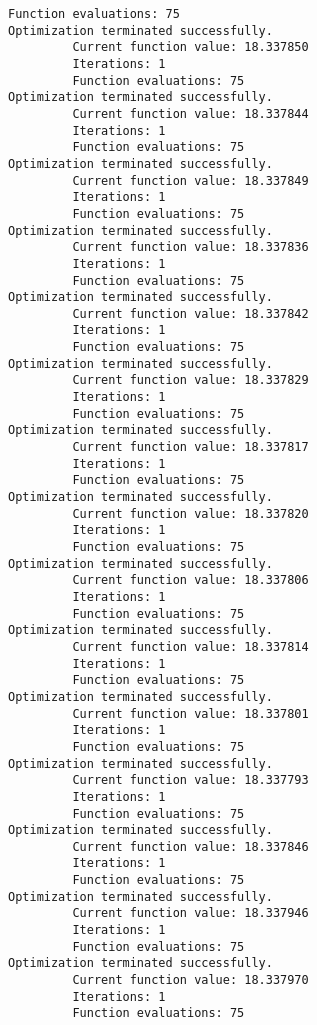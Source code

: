\documentclass[11pt]{article}
\begin{document}
\begin{Verbatim}[commandchars=\\\{\}]
         Function evaluations: 75
Optimization terminated successfully.
         Current function value: 18.337850
         Iterations: 1
         Function evaluations: 75
Optimization terminated successfully.
         Current function value: 18.337844
         Iterations: 1
         Function evaluations: 75
Optimization terminated successfully.
         Current function value: 18.337849
         Iterations: 1
         Function evaluations: 75
Optimization terminated successfully.
         Current function value: 18.337836
         Iterations: 1
         Function evaluations: 75
Optimization terminated successfully.
         Current function value: 18.337842
         Iterations: 1
         Function evaluations: 75
Optimization terminated successfully.
         Current function value: 18.337829
         Iterations: 1
         Function evaluations: 75
Optimization terminated successfully.
         Current function value: 18.337817
         Iterations: 1
         Function evaluations: 75
Optimization terminated successfully.
         Current function value: 18.337820
         Iterations: 1
         Function evaluations: 75
Optimization terminated successfully.
         Current function value: 18.337806
         Iterations: 1
         Function evaluations: 75
Optimization terminated successfully.
         Current function value: 18.337814
         Iterations: 1
         Function evaluations: 75
Optimization terminated successfully.
         Current function value: 18.337801
         Iterations: 1
         Function evaluations: 75
Optimization terminated successfully.
         Current function value: 18.337793
         Iterations: 1
         Function evaluations: 75
Optimization terminated successfully.
         Current function value: 18.337846
         Iterations: 1
         Function evaluations: 75
Optimization terminated successfully.
         Current function value: 18.337946
         Iterations: 1
         Function evaluations: 75
Optimization terminated successfully.
         Current function value: 18.337970
         Iterations: 1
         Function evaluations: 75

    \end{Verbatim}
\end{document}
